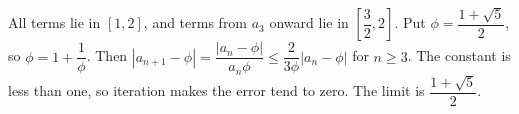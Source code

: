 All terms lie in $[1,2]$, and terms from $a_3$ onward lie in $[\dfrac{3}{2},2]$. Put $\phi=\dfrac{1+\sqrt5}{2}$, so $\phi=1+\dfrac{1}{\phi}$. Then $|a_{n+1}-\phi|=\dfrac{|a_n-\phi|}{a_n\phi}\le\dfrac{2}{3\phi}|a_n-\phi|$ for $n\ge3$. The constant is less than one, so iteration makes the error tend to zero. The limit is $\boxed{\dfrac{1+\sqrt5}{2}}$.
